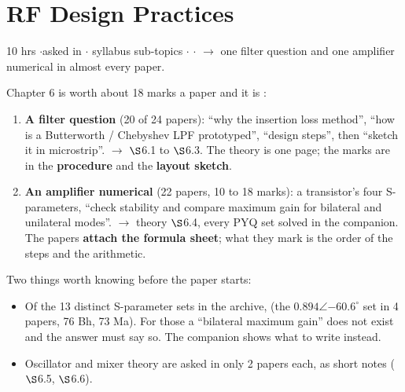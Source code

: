 \section{RF Design Practices}
{\color{sub}\footnotesize 10 hrs \gap$\cdot$\gap asked in 
\gap$\cdot$ syllabus sub-topics \gap$\cdot$\gap {} \gap$\cdot$\gap {}
$\rightarrow$ one filter question and one amplifier numerical in almost every paper.}

\vspace{3pt}\noindent
\colorbox{gdL}{\makebox[\dimexpr\textwidth-2\fboxsep][l]{%
  \textcolor{gd}{\bfseries\footnotesize READ THIS FIRST}}}
\par\nobreak\vspace{3pt}

Chapter 6 is worth about 18 marks a paper and it is :
\begin{enumerate}[label=\arabic*., leftmargin=1.4em, itemsep=1pt]
  \item \textbf{A filter question} (20 of 24 papers): ``why the insertion loss method'',
    ``how is a Butterworth / Chebyshev LPF prototyped'', ``design steps'', then ``sketch
    it in microstrip''. $\rightarrow$ $\S$6.1 to $\S$6.3. The theory is one page; the
    marks are in the \textbf{procedure} and the \textbf{layout sketch}.
  \item \textbf{An amplifier numerical} (22 papers, 10 to 18 marks): a transistor's four
    S-parameters, ``check stability and compare maximum gain for bilateral and unilateral
    modes''. $\rightarrow$ theory $\S$6.4, every PYQ set solved in the companion. The papers
    \textbf{attach the formula sheet}; what they mark is the order of the steps and the
    arithmetic.
\end{enumerate}
Two things worth knowing before the paper starts:
\begin{itemize}
  \item Of the 13 distinct S-parameter sets in the archive,  (the $0.894\angle{-60.6^\circ}$ set in 4 papers, 76 Bh, 73 Ma).
    For those a ``bilateral maximum gain'' does not exist and the answer must say so. The
    companion shows what to write instead.
  \item Oscillator and mixer theory are asked in only 2 papers each, as short notes
    ($\S$6.5, $\S$6.6).
\end{itemize}

